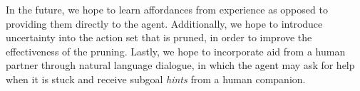 \documentclass[]{article}
\begin{document}
In the future, we hope to learn affordances from experience as opposed
to providing them directly to the agent. Additionally, we hope to
introduce uncertainty into the action set that is pruned, in order to
improve the effectiveness of the pruning. Lastly, we hope to
incorporate aid from a human partner through natural language
dialogue, in which the agent may ask for help when it is stuck and
receive subgoal {\it hints} from a human companion.


  
\end{document}
